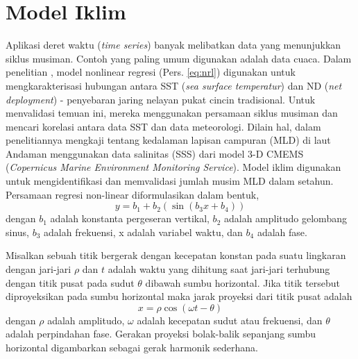 \section[Model Iklim]{Model Iklim}
\begin{spacing}{1.5}
	Aplikasi deret waktu (\textit{time series}) banyak melibatkan data yang menunjukkan siklus musiman. Contoh yang paling umum digunakan adalah data cuaca. Dalam penelitian , model nonlinear regresi (Pers. \ref{eq:nrl}) digunakan untuk mengkarakterisasi hubungan antara SST (\textit{sea surface temperatur}) dan ND (\textit{net deployment}) - penyebaran jaring nelayan pukat cincin tradisional. Untuk menvalidasi temuan ini, mereka menggunakan persamaan siklus musiman  dan mencari korelasi antara data SST dan data meteorologi. Dilain hal,  dalam penelitiannya mengkaji tentang kedalaman lapisan campuran (MLD) di laut Andaman menggunakan data salinitas (SSS) dari model 3-D CMEMS (\textit{Copernicus Marine Environment Monitoring Service}). Model iklim digunakan untuk mengidentifikasi dan memvalidasi jumlah musim MLD dalam setahun. Persamaan regresi non-linear  diformulasikan dalam bentuk,
	\begin{equation}\label{eq:nrl}
		y = b_1 + b_2(\sin(b_3x+b_4))
	\end{equation}
	dengan $b_1$ adalah konstanta pergeseran vertikal, $b_2$ adalah amplitudo gelombang sinus, $b_3$ adalah frekuensi, x adalah variabel waktu, dan $b_4$ adalah fase.
	
	Misalkan sebuah titik bergerak dengan kecepatan konstan pada suatu lingkaran dengan jari-jari $\rho$ dan $t$ adalah waktu yang dihitung saat jari-jari terhubung dengan titik pusat pada sudut $\theta$ dibawah sumbu horizontal. Jika titik tersebut diproyeksikan pada sumbu horizontal maka jarak proyeksi dari titik pusat adalah 
	\begin{equation}\label{eq:MIK1}
		x = \rho \cos(\omega t-\theta)
	\end{equation}
	dengan $\rho$ adalah amplitudo, $\omega$ adalah kecepatan sudut atau frekuensi, dan $\theta$ adalah perpindahan fase. Gerakan proyeksi bolak-balik sepanjang sumbu horizontal digambarkan sebagai gerak harmonik sederhana.
	

\end{spacing}
